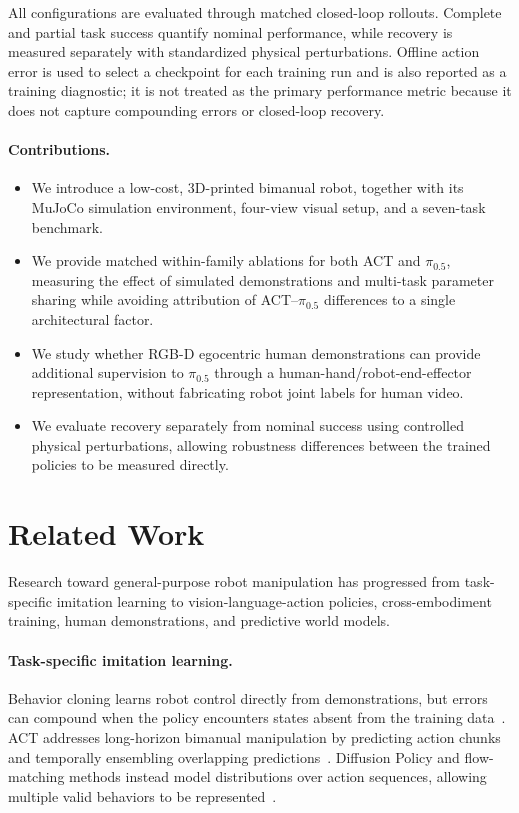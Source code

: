 \documentclass[10pt,conference]{IEEEtran}
\begin{document}
All configurations are evaluated through matched closed-loop rollouts. Complete
and partial task success quantify nominal performance, while recovery is measured
separately with standardized physical perturbations. Offline action error is
used to select a checkpoint for each training run and is also reported as a
training diagnostic; it is not treated as the primary performance metric because
it does not capture compounding errors or closed-loop recovery.

\paragraph{Contributions.}
\begin{itemize}[leftmargin=*]
    \item We introduce a low-cost, 3D-printed bimanual robot,
    together with its MuJoCo simulation environment, four-view visual setup, and
    a seven-task benchmark.

    \item We provide matched within-family ablations for both ACT and
    $\pi_{0.5}$, measuring the effect of simulated demonstrations and multi-task
    parameter sharing while avoiding attribution of ACT--$\pi_{0.5}$ differences
    to a single architectural factor.

    \item We study whether RGB-D egocentric human demonstrations can provide
    additional supervision to $\pi_{0.5}$ through a human-hand/robot-end-effector
    representation, without fabricating robot joint labels for human video.

    \item We evaluate recovery separately from nominal success using controlled
    physical perturbations, allowing robustness differences between the trained
    policies to be measured directly.
\end{itemize}

\section{Related Work}
\label{sec:related-work}

Research toward general-purpose robot manipulation has progressed from
task-specific imitation learning to vision-language-action policies,
cross-embodiment training, human demonstrations, and predictive world models.

\paragraph{Task-specific imitation learning.}
Behavior cloning learns robot control directly from demonstrations, but errors
can compound when the policy encounters states absent from the training
data~\cite{ross2011dagger}. ACT addresses long-horizon bimanual manipulation by
predicting action chunks and temporally ensembling overlapping
predictions~\cite{zhao2023act}. Diffusion Policy and flow-matching methods
instead model distributions over action sequences, allowing multiple valid
behaviors to be represented~\cite{chi2023diffusion,lipman2023flow}.
\end{document}
